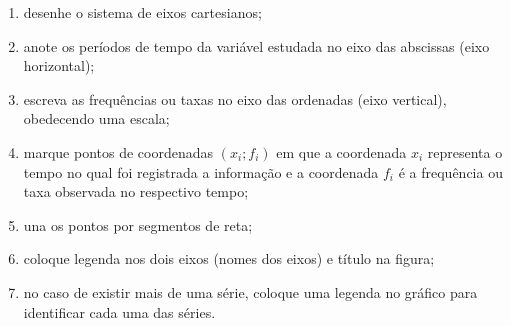 \documentclass[11pt,fleqn]{book} %
\begin{document}
\begin{enumerate}

\item desenhe o sistema de eixos cartesianos;

\item anote os períodos de tempo da variável estudada no eixo das abscissas (eixo horizontal);

\item escreva as frequências ou taxas no eixo das ordenadas (eixo vertical), obedecendo uma escala;

\item marque pontos de coordenadas $(x_i; f_i)$ em que a coordenada $x_i$ representa o tempo no qual foi registrada a informação e a coordenada $f_i$ é a frequência ou taxa observada no respectivo tempo;

\item una os pontos por segmentos de reta;

\item coloque legenda nos dois eixos (nomes dos eixos) e título na figura;

\item no caso de existir mais de uma série, coloque uma legenda no gráfico para identificar cada uma das séries. \\

\end{enumerate}
\end{document}
